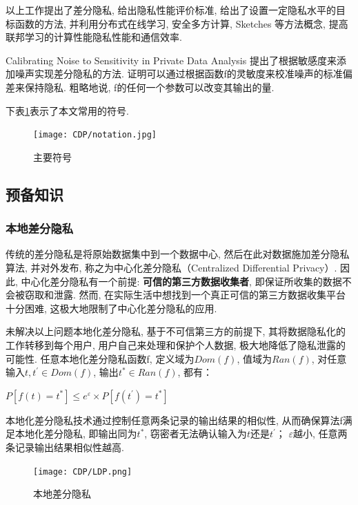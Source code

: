     以上工作提出了差分隐私, 给出隐私性能评价标准, 给出了设置一定隐私水平的目标函数的方法, 并利用分布式在线学习, 安全多方计算, Sketches 等方法概念, 提高联邦学习的计算性能隐私性能和通信效率. 

  
Calibrating Noise to Sensitivity in Private Data Analysis\cite{Dwork2006} 提出了根据敏感度来添加噪声实现差分隐私的方法. 证明可以通过根据函数f的灵敏度来校准噪声的标准偏差来保持隐私. 粗略地说, f的任何一个参数可以改变其输出的量. 


    下表\ref{tab:FLnotation}表示了本文常用的符号.
    \begin{figure}[!ht]
        \centering
        \texttt{[image: CDP/notation.jpg]}
        \caption{主要符号}
        \label{tab:FLnotation}
    \end{figure}
\subsection{预备知识}

 

\subsubsection{本地差分隐私}

传统的差分隐私是将原始数据集中到一个数据中心, 然后在此对数据施加差分隐私算法, 并对外发布, 称之为中心化差分隐私（Centralized Differential Privacy）. 因此, 中心化差分隐私有一个前提: \textbf{可信的第三方数据收集者}, 即保证所收集的数据不会被窃取和泄露. 然而, 在实际生活中想找到一个真正可信的第三方数据收集平台十分困难, 这极大地限制了中心化差分隐私的应用. 

未解决以上问题本地化差分隐私,  基于不可信第三方的前提下, 其将数据隐私化的工作转移到每个用户, 用户自己来处理和保护个人数据, 极大地降低了隐私泄露的可能性. 
任意本地化差分隐私函数f, 定义域为$Dom(f)$, 值域为$Ran(f)$, 对任意输入$t, t^{'} \in Dom(f)$, 输出$t^{*} \in Ran(f)$, 都有：

$P[ f(t) = t^{*} ] \leq e^{\varepsilon }\times P[ f(t^{'}) = t^{*} ] $

本地化差分隐私技术通过控制任意两条记录的输出结果的相似性, 从而确保算法f满足本地化差分隐私, 即输出同为$t^{*}$, 窃密者无法确认输入为$t$还是$t^{'}$；
$\varepsilon$越小, 任意两条记录输出结果相似性越高. 

\begin{figure}[!ht]
    \caption{本地差分隐私}
    \texttt{[image: CDP/LDP.png]}
\end{figure}

